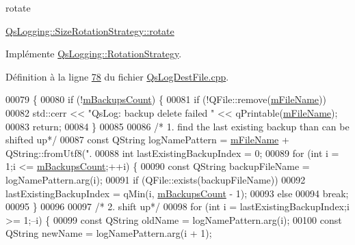 rotate 

\hyperlink{classQsLogging_1_1SizeRotationStrategy_a044a258f08b3f104ccc7fdd80bf45b1a}{Qs\-Logging\-::\-Size\-Rotation\-Strategy\-::rotate} 

Implémente \hyperlink{classQsLogging_1_1RotationStrategy_a11bc6e7d8af7df658f15abb69b3cc294}{Qs\-Logging\-::\-Rotation\-Strategy}.



Définition à la ligne \hyperlink{QsLogDestFile_8cpp_source_l00078}{78} du fichier \hyperlink{QsLogDestFile_8cpp_source}{Qs\-Log\-Dest\-File.\-cpp}.


\begin{DoxyCode}
00079 \{
00080     \textcolor{keywordflow}{if} (!\hyperlink{classQsLogging_1_1SizeRotationStrategy_a8ffbf6fc9110b82a399c90ce725023e9}{mBackupsCount}) \{
00081         \textcolor{keywordflow}{if} (!QFile::remove(\hyperlink{classQsLogging_1_1SizeRotationStrategy_a2a7187b9a1e4d957a9d5718c91a7f1b3}{mFileName}))
00082             std::cerr << \textcolor{stringliteral}{"QsLog: backup delete failed "} << qPrintable(\hyperlink{classQsLogging_1_1SizeRotationStrategy_a2a7187b9a1e4d957a9d5718c91a7f1b3}{mFileName});
00083         \textcolor{keywordflow}{return};
00084     \}
00085 
00086      \textcolor{comment}{/* 1. find the last existing backup than can be shifted up*/}
00087      \textcolor{keyword}{const} QString logNamePattern = \hyperlink{classQsLogging_1_1SizeRotationStrategy_a2a7187b9a1e4d957a9d5718c91a7f1b3}{mFileName} + QString::fromUtf8(\textcolor{stringliteral}{".%
00088      \textcolor{keywordtype}{int} lastExistingBackupIndex = 0;
00089      \textcolor{keywordflow}{for} (\textcolor{keywordtype}{int} i = 1;i <= \hyperlink{classQsLogging_1_1SizeRotationStrategy_a8ffbf6fc9110b82a399c90ce725023e9}{mBackupsCount};++i) \{
00090          \textcolor{keyword}{const} QString backupFileName = logNamePattern.arg(i);
00091          \textcolor{keywordflow}{if} (QFile::exists(backupFileName))
00092              lastExistingBackupIndex = qMin(i, \hyperlink{classQsLogging_1_1SizeRotationStrategy_a8ffbf6fc9110b82a399c90ce725023e9}{mBackupsCount} - 1);
00093          \textcolor{keywordflow}{else}
00094              \textcolor{keywordflow}{break};
00095      \}
00096 
00097      \textcolor{comment}{/* 2. shift up*/}
00098      \textcolor{keywordflow}{for} (\textcolor{keywordtype}{int} i = lastExistingBackupIndex;i >= 1;--i) \{
00099          \textcolor{keyword}{const} QString oldName = logNamePattern.arg(i);
00100          \textcolor{keyword}{const} QString newName = logNamePattern.arg(i + 1);
}
\end{DoxyCode}
